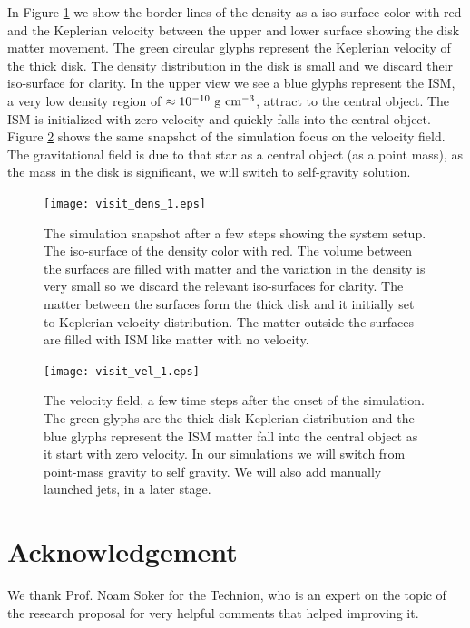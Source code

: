 \documentclass[modern]{aastex62}
\def \cm{~\rm{cm}}
\def \g{~\rm{g}}
\begin{document}
In Figure \ref{fig:preliminary-result-density} we show the border lines of the density as a iso-surface color with red and the Keplerian velocity between the upper and lower surface showing the disk matter movement. The green circular glyphs represent the Keplerian velocity of the thick disk. The density distribution in the disk is small and we discard their iso-surface for clarity. In the upper view we see a blue glyphs represent the ISM, a very low density region of $\approx 10^{-10} \g\cm^{-3}$, attract to the central object.
The ISM is initialized with zero velocity and quickly falls into the central object. Figure \ref{fig:preliminary-result-velocity} shows the same snapshot of the simulation focus on the velocity field.  
The gravitational field is due to that star as a central object (as a point mass), as the mass in the disk is significant, we will switch to self-gravity solution.

%
\begin{figure}[t!]
\texttt{[image: visit\_dens\_1.eps]}
\caption{The simulation snapshot after a few steps showing the system setup. The iso-surface of the density color with red. The volume between the surfaces are filled with matter and the variation in the density is very small so we discard the relevant iso-surfaces for clarity. The matter between the surfaces form the thick disk and it initially set to Keplerian velocity distribution. The matter outside the surfaces are filled with ISM like matter with no velocity.}\label{fig:preliminary-result-density}
\end{figure}
%
\begin{figure}[t!]
\texttt{[image: visit\_vel\_1.eps]}
\caption{The velocity field, a few time steps after the onset of the simulation. The green glyphs are the thick disk Keplerian distribution and the blue glyphs represent the ISM matter fall into the central object as it start with zero velocity.
In our simulations we will switch from point-mass gravity to self gravity. We will also add manually launched jets, in a later stage.
}\label{fig:preliminary-result-velocity}
\end{figure}

\section*{Acknowledgement}
We thank Prof. Noam Soker for the Technion, who is an expert on the topic of the research proposal for very helpful comments that helped improving it.
\appendix
\end{document}
